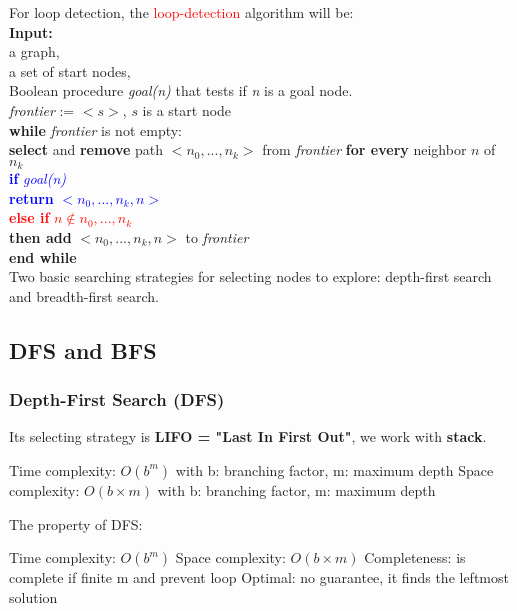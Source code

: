 \noindent
For loop detection, the \textcolor{red}{loop-detection} algorithm will be: \\
\textbf{Input:} \\
\tabto{5mm} a graph, \\
\tabto{5mm} a set of start nodes, \\
\tabto{5mm} Boolean procedure \emph{goal(n)} that tests if \emph{n} is a goal node. \\
\emph{frontier} := {$<s>$, $s$ is a start node} \\
\textbf{while} \emph{frontier} is not empty: \\
\tabto{5mm} \textbf{select} and \textbf{remove} path $<n_{0},...,n_{k}>$ from \emph{frontier} \textbf{for every} neighbor $n$ of $n_{k}$ \\
\tabto{10mm} \textcolor{blue}{\textbf{if} \emph{goal(n)}} \\
\tabto{15mm} \textcolor{blue}{\textbf{return} $<n_{0},...,n_{k},n>$} \\
\tabto{10mm} \textcolor{red}{\textbf{else if} $n \notin {n_{0},...,n_{k}}$} \\
\tabto{15mm} \textbf{then add} $<n_{0},...,n_{k},n>$ to \emph{frontier} \\
\textbf{end while} \\

Two basic searching strategies for selecting nodes to explore: depth-first search and breadth-first search.

\subsection{DFS and BFS}
\subsubsection{Depth-First Search (DFS)}
Its selecting strategy is \textbf{LIFO = "Last In First Out"}, we work with \textbf{stack}. 
\begin{outline}
    \1 Time complexity: $O(b^{m})$
        \2 with b: branching factor, m: maximum depth
    \1 Space complexity: $O(b \times m)$
        \2 with b: branching factor, m: maximum depth
\end{outline}

\noindent
The property of DFS:
\begin{outline}
    \1 Time complexity: $O(b^{m})$
    \1 Space complexity: $O(b \times m)$
    \1 Completeness: is complete if finite m and prevent loop
    \1 Optimal: no guarantee, it finds the leftmost solution
\end{outline}

